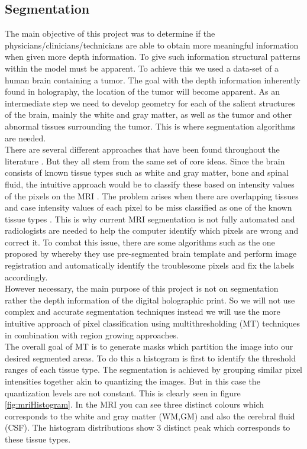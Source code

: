 \subsection{Segmentation}

The main objective of this project was to determine if the physicians/clinicians/technicians are able to obtain more meaningful information when given more depth information.  To give such information structural patterns within the model must be apparent. To achieve this we used a data-set of a human brain containing a tumor. The goal with the depth information inherently found in holography, the location of the tumor will become apparent.  As an intermediate step we need to develop geometry for each of the salient structures of the brain, mainly the white and gray matter, as well as the tumor and other abnormal tissues surrounding the tumor.  This is where segmentation algorithms are needed.\\

There are several different approaches that have been found throughout the literature \cite{pham2000current}.  But they all stem from the same set of core ideas.  Since the brain consists of known tissue types such as white and gray matter, bone and spinal fluid, the intuitive approach would be to classify these based on intensity values of the pixels on the MRI \cite{atkins1998fully}.  The problem arises when there are overlapping tissues and case intensity values of each pixel to be miss classified as one of the known tissue types \cite{undeman2003fully}.  This is why current MRI segmentation is not fully automated and radiologists are needed to help the computer identify which pixels are wrong and correct it. To combat this issue, there are some algorithms such as the one proposed by \cite{lenroot2006brain} whereby they use pre-segmented brain template and perform image registration and automatically identify the troublesome pixels and fix the labels accordingly.\\  

However necessary, the main purpose of this project is not on segmentation rather the depth information of the digital holographic print.  So we will not use complex and accurate segmentation techniques instead we will use the more intuitive approach of pixel classification using multithresholding (MT) techniques \cite{sahoo1988survey} in combination with region growing approaches\cite{adams1994seeded}.\\

The overall goal of MT is to generate masks which partition the image into our desired segmented areas.  To do this a histogram is first to identify the threshold ranges of each tissue type.  The segmentation is achieved by grouping similar pixel intensities together akin to quantizing the images.  But in this case the quantization levels are not constant. This is clearly seen in figure \ref{fig:mriHistogram}.  In the MRI you can see three distinct colours which corresponds to the white and gray matter (WM,GM) and also the cerebral fluid (CSF).  The histogram distributions show 3 distinct peak which corresponds to these tissue types.

